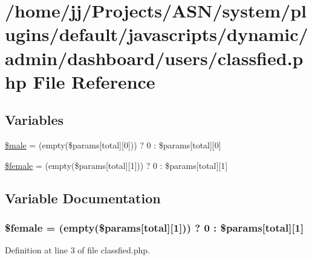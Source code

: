 \hypertarget{classfied_8php}{}\section{/home/jj/\+Projects/\+A\+S\+N/system/plugins/default/javascripts/dynamic/admin/dashboard/users/classfied.php File Reference}
\label{classfied_8php}
\subsection*{Variables}
\begin{DoxyCompactItemize}
\item 
\hyperlink{classfied_8php_a6821aca48174358a0fdb83bde51bd7de}{\$male} = (empty(\$params\mbox{[}\textquotesingle{}total\textquotesingle{}\mbox{]}\mbox{[}0\mbox{]})) ? \textquotesingle{}0\textquotesingle{} \+: \$params\mbox{[}\textquotesingle{}total\textquotesingle{}\mbox{]}\mbox{[}0\mbox{]}
\item 
\hyperlink{classfied_8php_adcc1a1050a0684f9efffb95fe55ac154}{\$female} = (empty(\$params\mbox{[}\textquotesingle{}total\textquotesingle{}\mbox{]}\mbox{[}1\mbox{]})) ? \textquotesingle{}0\textquotesingle{} \+: \$params\mbox{[}\textquotesingle{}total\textquotesingle{}\mbox{]}\mbox{[}1\mbox{]}
\end{DoxyCompactItemize}


\subsection{Variable Documentation}
\subsubsection[{\texorpdfstring{\$female}{$female}}]{\setlength{\rightskip}{0pt plus 5cm}\$female = (empty(\$params\mbox{[}\textquotesingle{}total\textquotesingle{}\mbox{]}\mbox{[}1\mbox{]})) ? \textquotesingle{}0\textquotesingle{} \+: \$params\mbox{[}\textquotesingle{}total\textquotesingle{}\mbox{]}\mbox{[}1\mbox{]}}\hypertarget{classfied_8php_adcc1a1050a0684f9efffb95fe55ac154}{}\label{classfied_8php_adcc1a1050a0684f9efffb95fe55ac154}


Definition at line 3 of file classfied.\+php.

